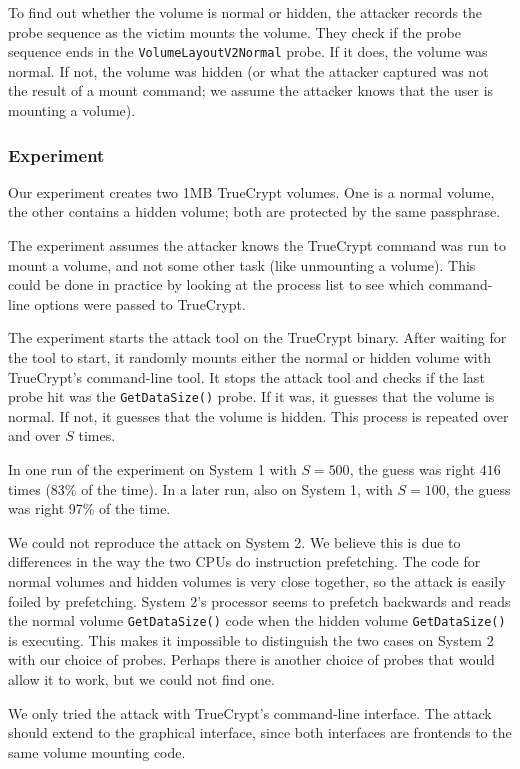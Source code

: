 \documentclass[letterpaper,twocolumn,10pt]{article}
\begin{document}
To find out whether the volume is normal or hidden, the attacker records the
probe sequence as the victim mounts the volume. They check if the probe sequence
ends in the \texttt{VolumeLayoutV2Normal} probe. If it does, the volume was
normal. If not, the volume was hidden (or what the attacker captured was not the
result of a mount command; we assume the attacker knows that the user is
mounting a volume).

\subsubsection{Experiment}

Our experiment creates two 1MB TrueCrypt volumes. One is a normal volume, the
other contains a hidden volume; both are protected by the same passphrase.

The experiment assumes the attacker knows the TrueCrypt command was run to mount
a volume, and not some other task (like unmounting a volume). This could be done
in practice by looking at the process list to see which command-line options
were passed to TrueCrypt.

The experiment starts the attack tool on the TrueCrypt binary. After waiting for
the tool to start, it randomly mounts either the normal or hidden volume with
TrueCrypt's command-line tool. It stops the attack tool and checks if the last
probe hit was the \texttt{GetDataSize()} probe. If it was, it guesses that the
volume is normal. If not, it guesses that the volume is hidden. This process is
repeated over and over $S$ times.

In one run of the experiment on System 1 with
$S=500$, the guess was right $416$ times (83\% of the time). In a later
run, also on System 1, with $S=100$, the guess was
right 97\% of the time.

We could not reproduce the attack on System 2. We believe this is due to
differences in the way the two CPUs do instruction prefetching. The code for
normal volumes and hidden volumes is very close together, so the attack is
easily foiled by prefetching. System 2's processor seems to prefetch backwards
and reads the normal volume \texttt{GetDataSize()} code when the hidden volume
\texttt{GetDataSize()} is executing. This makes it impossible to distinguish the
two cases on System 2 with our choice of probes. Perhaps there is another choice
of probes that would allow it to work, but we could not find one.

We only tried the attack with TrueCrypt's command-line interface. The attack
should extend to the graphical interface, since both interfaces are frontends to
the same volume mounting code. 
\end{document}
